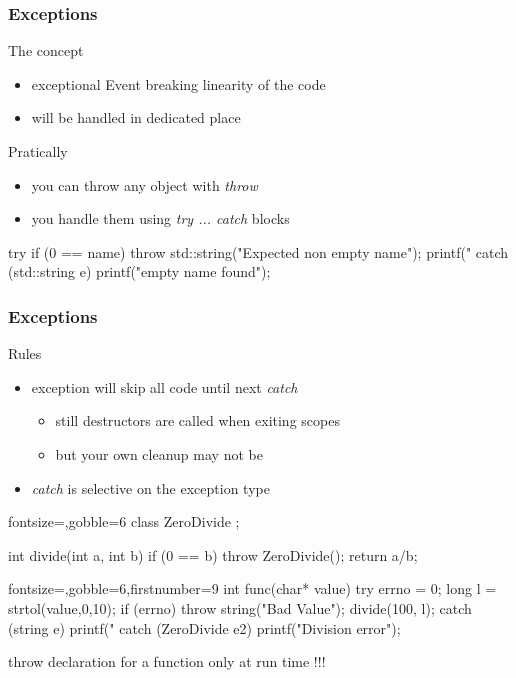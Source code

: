 \begin{frame}[fragile]
  \frametitle{Exceptions}
  \begin{block}{The concept}
    \begin{itemize}
    \item exceptional Event breaking linearity of the code
    \item will be handled in dedicated place
    \end{itemize}
  \end{block}
  \begin{block}{Pratically}
    \begin{itemize}
    \item you can throw any object with {\it throw}
    \item you handle them using {\it try ... catch} blocks
    \end{itemize}
  \end{block}
  \begin{cppcode*}{}
    try {
      if (0 == name) {
        throw std::string("Expected non empty name");
      }
      printf("%
    } catch (std::string e) {
      printf("empty name found\n");      
    }
  \end{cppcode*}
\end{frame}

\begin{frame}[fragile]
  \frametitle{Exceptions}
  \begin{block}{Rules}
    \begin{itemize}
    \item exception will skip all code until next {\it catch}
    \begin{itemize}
      \item still destructors are called when exiting scopes
      \item but your own cleanup may not be
    \end{itemize}
    \item {\it catch} is selective on the exception type
    \end{itemize}
  \end{block}
  \begin{multicols}{2}
    \begin{cppcode*}{fontsize=\scriptsize,gobble=6}
      class ZeroDivide {};
      
      int divide(int a, int b) {
        if (0 == b) {
          throw ZeroDivide();
        }
        return a/b;
      }
    \end{cppcode*}
    \columnbreak
    \begin{cppcode*}{fontsize=\scriptsize,gobble=6,firstnumber=9} 
      int func(char* value) {
        try {
          errno = 0;
          long l = strtol(value,0,10);
          if (errno) {
            throw string("Bad Value");
          }
          divide(100, l);
        } catch (string e) {
          printf("%
        } catch (ZeroDivide e2) {
          printf("Division error\n");
        }
      }
    \end{cppcode*}
  \end{multicols}
\end{frame}

\xxx throw declaration for a function
\xxx only at run time !!!
